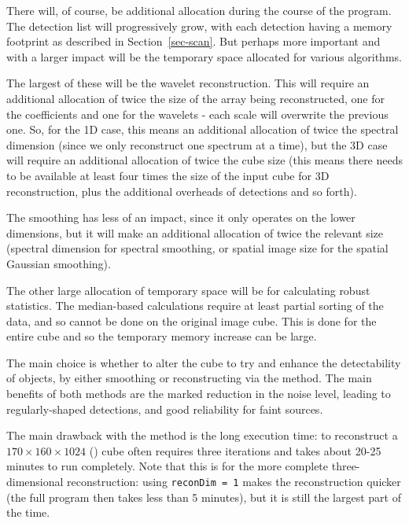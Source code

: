 There will, of course, be additional allocation during the course of
the program. The detection list will progressively grow, with each
detection having a memory footprint as described in
Section~\ref{sec-scan}. But perhaps more important and with a larger
impact will be the temporary space allocated for various algorithms.

The largest of these will be the wavelet reconstruction. This will
require an additional allocation of twice the size of the array being
reconstructed, one for the coefficients and one for the wavelets -
each scale will overwrite the previous one. So, for the 1D case, this
means an additional allocation of twice the spectral dimension (since
we only reconstruct one spectrum at a time), but the 3D case will
require an additional allocation of twice the cube size (this means
there needs to be available at least four times the size of the input
cube for 3D reconstruction, plus the additional overheads of
detections and so forth).

The smoothing has less of an impact, since it only operates on the
lower dimensions, but it will make an additional allocation of twice
the relevant size (spectral dimension for spectral smoothing, or
spatial image size for the spatial Gaussian smoothing).

The other large allocation of temporary space will be for calculating
robust statistics. The median-based calculations require at least
partial sorting of the data, and so cannot be done on the original
image cube. This is done for the entire cube and so the temporary
memory increase can be large.





The main choice is whether to alter the cube to try and enhance the
detectability of objects, by either smoothing or reconstructing via
the \atrous method. The main benefits of both methods are the marked
reduction in the noise level, leading to regularly-shaped detections,
and good reliability for faint sources.

The main drawback with the \atrous method is the long execution time:
to reconstruct a $170\times160\times1024$ (\hipass) cube often
requires three iterations and takes about 20-25 minutes to run
completely. Note that this is for the more complete three-dimensional
reconstruction: using \texttt{reconDim = 1} makes the reconstruction
quicker (the full program then takes less than 5 minutes), but it is
still the largest part of the time.

